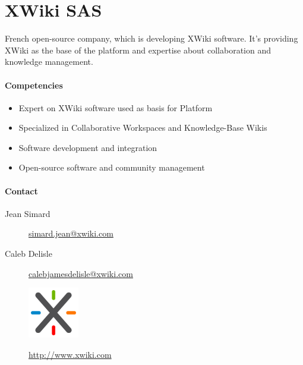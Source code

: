 \documentclass{learnpad}
\begin{document}
\section{XWiki SAS}
French open-source company, which is developing XWiki software.  It's providing
XWiki as the base of the \learnpad platform and expertise about collaboration
and knowledge management.

\paragraph{Competencies}
\begin{itemize}
	\item Expert on XWiki software used as basis for \learnpad Platform
	\item Specialized in Collaborative Workspaces and Knowledge-Base Wikis
	\item Software development and integration
	\item Open-source software and community management
\end{itemize}

\paragraph{Contact}
\begin{description}
	\item[Jean Simard] \href{mailto:simard.jean@xwiki.com}{simard.jean@xwiki.com}
	\item[Caleb Delisle] \href{mailto:calebjamesdelisle@xwiki.com}{calebjamesdelisle@xwiki.com}
\end{description}

\begin{figure}[!htp]
	\centering
	\includegraphics[width=6em,keepaspectratio]{figures/xwiki.png}\par
	\url{http://www.xwiki.com}
\end{figure}







% 
% 
\end{document}
